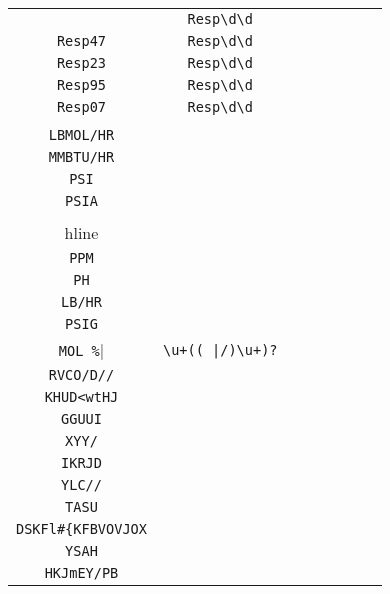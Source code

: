 \begin{longtable}{cccccccc}
\begin{tabular}{ll}
    \verb|Resp41| & \verb|Resp\d\d|\\
\verb|Resp47| & \verb|Resp\d\d|\\
\verb|Resp23| & \verb|Resp\d\d|\\
\verb|Resp95| & \verb|Resp\d\d|\\
\verb|Resp07| & \verb|Resp\d\d|
\end{tabular}
\\\midrule 
\begin{tabular}{l}
    \verb|DEG F|\\
\verb|LBMOL/HR|\\
\verb|MMBTU/HR|\\
\verb|PSI|\\
\verb|PSIA|\\
\\hline\\
\verb|PPM|\\
\verb|PH|\\
\verb|LB/HR|\\
\verb|PSIG|\\
\verb|MOL %|
\end{tabular}

&
\verb.\u+(( |/)\u+)?.
&

\begin{tabular}{l}
    \verb|\u\u\u(.)*((\u)*/)*(\u)*|\\
\verb|RVCO/D//|\\
\verb|KHUD<wtHJ|\\
\verb|GGUUI|\\
\verb|XYY/|\\
\verb|IKRJD|
\end{tabular}

&

\begin{tabular}{l}
    \verb|\u\u\u(.)*((\u)*/)*(\u)*|\\
\verb|YLC//|\\
\verb|TASU|\\
\verb|DSKFl#{KFBVOVJOX|\\
\verb|YSAH|\\
\verb|HKJmEY/PB|
\end{tabular}

&


\end{longtable}
